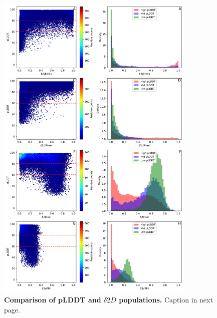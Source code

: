 \begin{figure}[H]
    \centering
    \includegraphics[width=0.85\textwidth]{pLDDT/plddt_figures/plddt_vs_d2d_hexbin_hist_undivided.pdf}
    \caption{\textbf{Comparison of pLDDT and $\delta 2D$ populations.} Caption in next page. 
    }
    \label{fig:plddt_vs_d2d_undivided}
\end{figure}


